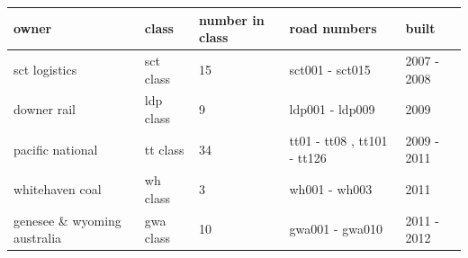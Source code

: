 \documentclass{article}
\begin{document}
\begin{tabular}{lllll}
\toprule
owner & class & number in class & road numbers & built \\
\midrule
sct logistics & sct class & 15 & sct001 - sct015 & 2007 - 2008 \\
downer rail & ldp class & 9 & ldp001 - ldp009 & 2009 \\
pacific national & tt class & 34 & tt01 - tt08 , tt101 - tt126 & 2009 - 2011 \\
whitehaven coal & wh class & 3 & wh001 - wh003 & 2011 \\
genesee \& wyoming australia & gwa class & 10 & gwa001 - gwa010 & 2011 - 2012 \\
\bottomrule
\end{tabular}
\end{document}
